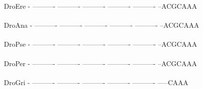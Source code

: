 \documentclass[11pt,twoside,reqno,a4paper]{article}
\begin{document}
{DroEre	-	----------	----------	----------	----------	----------	--ACGCAAA\\
\hspace*{7\charwidth}\hspace*{1\charwidth}\hspace*{1\charwidth}\hspace*{1\charwidth}\hspace*{1\charwidth}\hspace*{1\charwidth}\hspace*{1\charwidth}\\
DroAna	-	----------	----------	----------	----------	----------	--ACGCAAA\\
\hspace*{7\charwidth}\hspace*{1\charwidth}\hspace*{1\charwidth}\hspace*{1\charwidth}\hspace*{1\charwidth}\hspace*{1\charwidth}\hspace*{1\charwidth}\\
DroPse	-	----------	----------	----------	----------	----------	--ACGCAAA\\
\hspace*{7\charwidth}\hspace*{1\charwidth}\hspace*{1\charwidth}\hspace*{1\charwidth}\hspace*{1\charwidth}\hspace*{1\charwidth}\hspace*{1\charwidth}\\
DroPer	-	----------	----------	----------	----------	----------	--ACGCAAA\\
\hspace*{7\charwidth}\hspace*{1\charwidth}\hspace*{1\charwidth}\hspace*{1\charwidth}\hspace*{1\charwidth}\hspace*{1\charwidth}\hspace*{1\charwidth}\\
DroGri	-	----------	----------	----------	----------	----------	-----CAAA\\
\hspace*{7\charwidth}\hspace*{1\charwidth}\hspace*{1\charwidth}\hspace*{1\charwidth}\hspace*{1\charwidth}\hspace*{1\charwidth}\hspace*{1\charwidth}\\
}
\end{document}
